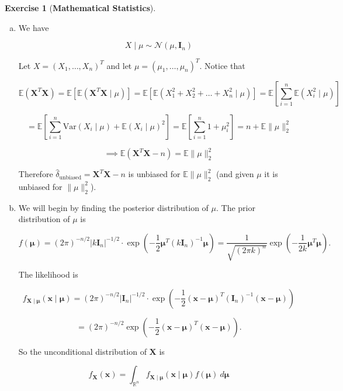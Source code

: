 \documentclass{article}
\theoremstyle{definition}
\newtheorem{exercise}{Exercise}
\theoremstyle{definition}
\theoremstyle{definition}
\theoremstyle{definition}
\theoremstyle{definition}
\newcommand{\E}{\mathbb{E}}
\newcommand{\Var}{\mathrm{Var}}
\begin{document}
\begin{exercise}[\textbf{Mathematical Statistics}]

\begin{enumerate}[(a)]

\item We have

\[
X \mid \mu \sim \mathcal{N}(\mu, \boldsymbol{I}_n)
\]

Let \(X = (X_1, \ldots, X_n)^T\) and let \(\mu = (\mu_1, \ldots, \mu_n)^T\). Notice that

\[
\E(\boldsymbol{X}^T\boldsymbol{X}) = \E[ \E(\boldsymbol{X}^T\boldsymbol{X} \mid \mu)] =  \E \left[ \E \left( X_1^2 + X_2^2 + \ldots + X_n^2 \mid \mu \right)  \right] = \E \left[ \sum_{i=1}^n \E (X_i^2 \mid \mu )  \right] 
\]

\[
= \E \left[ \sum_{i=1}^n \Var(X_i \mid \mu) + \E(X_i \mid \mu)^2  \right]  =  \E \left[ \sum_{i=1}^n 1+ \mu_i^2 \right] = n + \E \lVert \mu \rVert_2^2 
\]

\[
\implies \E(\boldsymbol{X}^T\boldsymbol{X} - n) =  \E \lVert \mu \rVert_2^2 
\]

Therefore \(\boxed{ \hat{\delta}_{\text{unbiased}} = \boldsymbol{X}^T\boldsymbol{X} - n}\) is unbiased for \(\E \lVert \mu \rVert_2^2\) (and given \(\mu\) it is unbiased for \(\lVert \mu \rVert_2^2\)).

\item We will begin by finding the posterior distribution of \(\mu\). The prior distribution of \(\mu\) is

\[
f(\boldsymbol{\mu}) = (2 \pi)^{-n/2} | k\boldsymbol{I}_n|^{-1/2} \cdot \exp \left(- \frac{1}{2} \boldsymbol{\mu} ^T ( k\boldsymbol{I}_n)^{-1} \boldsymbol{\mu} \right) = \frac{1}{\sqrt{(2 \pi k)^n}} \exp \left(- \frac{1}{2k}\boldsymbol{\mu} ^T  \boldsymbol{\mu} \right).
\]


The likelihood is

\[
f_{\boldsymbol{X} \mid \boldsymbol{\mu}}(\boldsymbol{x} \mid \boldsymbol{\mu}) = (2 \pi)^{-n/2} | \boldsymbol{I}_n|^{-1/2} \cdot \exp \left(- \frac{1}{2}(\boldsymbol{x} - \boldsymbol{\mu}) ^T ( \boldsymbol{I}_n)^{-1} (\boldsymbol{x} - \boldsymbol{\mu} ) \right)
\]

\[
= (2 \pi)^{-n/2} \exp \left(- \frac{1}{2}(\boldsymbol{x} - \boldsymbol{\mu}) ^T  (\boldsymbol{x} - \boldsymbol{\mu} ) \right).
\]

So the unconditional distribution of \(\boldsymbol{X}\) is

\[
f_{\boldsymbol{X}}(\boldsymbol{x})  = \int_{\mathbb{R}^n} f_{\boldsymbol{X} \mid \boldsymbol{\mu}}(\boldsymbol{x} \mid \boldsymbol{\mu}) f(\boldsymbol{\mu}) \ d \boldsymbol{\mu} 
\]


\end{enumerate}
\end{exercise}
\end{document}
